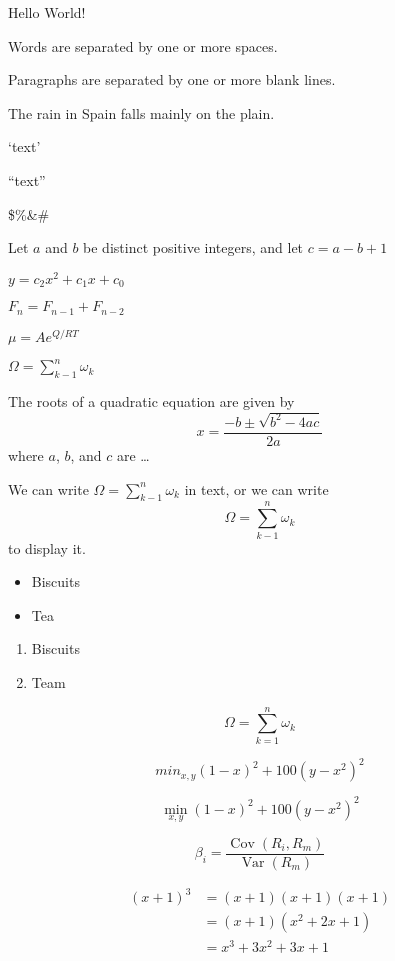 \documentclass{article}
\begin{document}
Hello World! %

Words are separated by one or more spaces.

Paragraphs are separated by one or more blank lines.

The   rain     in Spain falls mainly on the plain.

`text'

``text''

\$\%\&\#

Let $a$ and $b$ be distinct positive integers, and let $c = a - b + 1$ 

$y = c_2x^2 + c_1x + c_0$

$F_n = F_{n-1} + F_{n-2}$

$\mu = Ae^{Q/RT}$

$\Omega = \sum_{k-1}^n\omega_k$

The roots of a quadratic equation are given by
\begin{equation}
    x = \frac{-b \pm \sqrt{b^2 - 4ac}}{2a}
\end{equation}
where $a$, $b$, and $c$ are \ldots

We can write $\Omega = \sum_{k-1}^{n} \omega_k$ in text, or we can write
\begin{equation}
    \Omega = \sum_{k-1}^{n} \omega_k
\end{equation}
to display it.

\begin{itemize}
    \item Biscuits
    \item Tea
\end{itemize}

\begin{enumerate}
    \item Biscuits
    \item Team
\end{enumerate}

\begin{equation*}
\Omega = \sum_{k=1}^{n} \omega_k
\end{equation*}

\begin{equation*} %
min_{x,y} (1-x)^2 + 100(y-x^2)^2
\end{equation*}

\begin{equation*} %
\min_{x,y}{(1-x)^2 + 100(y-x^2)^2}
\end{equation*}

\begin{equation*}
\beta_i = \frac{\operatorname{Cov}(R_i, R_m)}{\operatorname{Var}(R_m)}
\end{equation*}


\begin{align*}
(x+1)^3 &= (x+1)(x+1)(x+1) \\
&= (x+1)(x^2 + 2x + 1) \\
&= x^3 + 3x^2 + 3x + 1
\end{align*}
\end{document}

